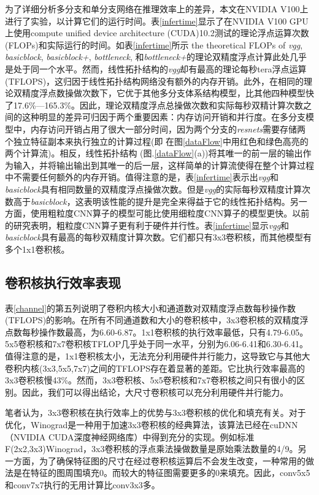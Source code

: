 为了详细分析多分支和单分支网络在推理效率上的差异，本文在NVIDIA V100上进行了实验，以计算它们的运行时间。表\ref{infertime}显示了在NVIDIA V100 GPU上使用compute unified device architecture (CUDA)10.2测试的理论浮点运算次数(FLOPs)和实际运行的时间。如表\ref{infertime}所示 the theoretical FLOPs of \emph{vgg}, \emph{basicblock}, \emph{basicblock+}, \emph{bottleneck}, 和\emph{bottleneck+}的理论双精度浮点计算此处几乎是处于同一个水平。然而，线性拓扑结构的\emph{vgg}却有最高的理论每秒tera浮点运算(TFLOPS)，这归因于线性拓扑结构网络没有额外的内存开销。此外，在相同的理论双精度浮点数操做次数下，它优于其他多分支体系结构模型，比其他四种模型快了17.6\%—165.3\%。因此，理论双精度浮点总操做次数和实际每秒双精计算次数之间的这种明显的差异可归因于两个重要因素：内存访问开销和并行度。在多分支模型中，内存访问开销占用了很大一部分时间，因为两个分支的\emph{resnets}需要存储两个独立特征副本来执行独立的计算过程(即 在图\ref{dataFlow}中用红色和绿色高亮的两个计算流)。相反，线性拓扑结构 (图.\ref{dataFlow}(a))将其唯一的前一层的输出作为输入，并将输出输出到其唯一的后一层，这样简单的计算流使得在整个计算过程中不需要任何额外的内存开销。值得注意的是，表\ref{infertime}表示出\emph{vgg}和\emph{basicblock}具有相同数量的双精度浮点操做次数。但是\emph{vgg}的实际每秒双精度计算次数高于\emph{basicblock}，这表明该性能的提升是完全来得益于它的线性拓扑结构。另一方面，使用粗粒度CNN算子的模型可能比使用细粒度CNN算子的模型更快。以前的研究表明，粗粒度CNN算子更有利于硬件并行性。表\ref{infertime}显示\emph{vgg}和\emph{basicblock}具有最高的每秒双精度计算次数。它们都只有3x3卷积核，而其他模型有多个1x1卷积核。

\subsection{卷积核执行效率表现}
表\ref{channel}的第五列说明了卷积内核大小和通道数对双精度浮点数每秒操作数(TFLOPS)的影响。在所有不同通道数和大小的卷积核中，3x3卷积核的双精度浮点数每秒操作数最高，为6.60-6.87。1x1卷积核的执行效率最低，只有4.79-6.05。5x5卷积核和7x7卷积核TFLOP几乎处于同一水平，分别为6.06-6.41和6.30-6.41。值得注意的是，1x1卷积核太小，无法充分利用硬件并行能力，这导致它与其他大卷积内核(3x3,5x5,7x7)之间的TFLOPS存在着显著的差距。它比执行效率最高的3x3卷积核慢43\%。然而，3x3卷积核、5x5卷积核和7x7卷积核之间只有很小的区别。因此，我们可以得出结论，大尺寸卷积核可以充分利用硬件并行能力。

笔者认为，3x3卷积核在执行效率上的优势与3x3卷积核的优化和填充有关。对于优化，Winograd\cite{LavinG16}是一种用于加速3x3卷积核的经典算法，该算法已经在cuDNN（NVIDIA CUDA深度神经网络库）中得到充分的实现。例如标准F(2x2,3x3)Winograd，3x3卷积核的浮点乘法操做数量是原始乘法数量的4/9。另一方面，为了确保特征图的尺寸在经过卷积核运算后不会发生改变，一种常用的做法是在特征的图周围填充0。而较大的特征图需要更多的0来填充。因此，conv5x5和conv7x7执行的无用计算比conv3x3多。

